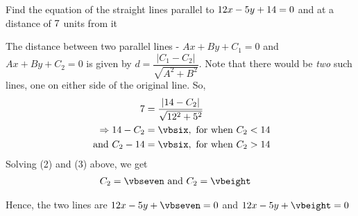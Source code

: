 



\gcalcHypotenuse[0]{\vbfive}{\vbone}{\vbtwo}
\gcalcexpr[0]{\vbsix}{\vbfour * \vbfive }
\gcalcexpr[0]{\vbseven}{\vbthree - \vbsix}
\gcalcexpr[0]{\vbeight}{\vbsix + \vbthree}

\question[3] Find the equation of the straight lines parallel to $12 x - 5 y + 14 = 0$ 
and at a distance of $7$ units from it


\watchout

\ifprintanswers
\fi 

\begin{solution}[\halfpage]
	The distance between two parallel lines - $Ax + By + C_1 = 0$ and $Ax+By+C_2 = 0$ is given by 
	$d = \dfrac{\vert C_1 - C_2 \vert}{\sqrt{A^2+ B^2}}$. Note that there would be \textit{two} such lines, 
	one on either side of the original line. So,
	\begin{align}
		\vbfour &= \dfrac{\vert \vbthree - C_2 \vert}{\sqrt{\vbone^2 + \vbtwo^2}} \\
		\Rightarrow \vbthree - C_2 &= \vbsix, \text{ for when } C_2 < \vbthree \\
		\text{ and } C_2 - \vbthree &= \vbsix, \text{ for when } C_2 > \vbthree
	\end{align}
	Solving (2) and (3) above, we get 
	\begin{align}
		C_2 &= \vbseven \text{ and } C_2 = \vbeight
	\end{align}
	
	Hence, the two lines are $\vbone x - \vbtwo y + \vbseven = 0$ and $\vbone x - \vbtwo y + \vbeight = 0$
\end{solution}

